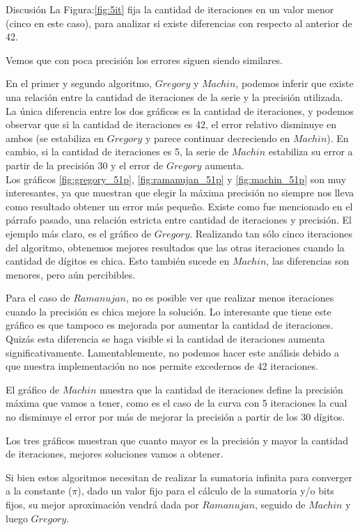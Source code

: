 \begin{section}{Discusión}
	La Figura:\ref{fig:5it} fija la cantidad de iteraciones en un valor menor (cinco en este caso), para analizar si existe diferencias con respecto al anterior de 42.
	
	Vemos que con poca precisión los errores siguen siendo similares.
	
	En el primer y segundo algoritmo, $Gregory$ y $Machin$, podemos inferir que existe una relación entre la cantidad de iteraciones de la serie y la precisión utilizada. La única diferencia entre los dos gráficos es la cantidad de iteraciones, y podemos observar que si la cantidad de iteraciones es 42, el error relativo disminuye en ambos (se estabiliza en $Gregory$ y parece continuar decreciendo en $Machin$). En cambio, si la cantidad de iteraciones es 5, la serie de $Machin$ estabiliza su error a partir de la precisión 30 y el error de $Gregory$ aumenta. \\
	
	Los gráficos \ref{fig:gregory_51p}, \ref{fig:ramanujan_51p} y \ref{fig:machin_51p} son muy interesantes, ya que muestran que elegir la máxima precisión no siempre nos lleva como resultado obtener un error más pequeño. Existe como fue mencionado en el párrafo pasado, una relación estricta entre cantidad de iteraciones y precisión. El ejemplo más claro, es el gráfico de $Gregory$. Realizando tan sólo cinco iteraciones del algoritmo, obtenemos mejores resultados que las otras iteraciones cuando la cantidad de dígitos es chica. Esto también sucede en $Machin$, las diferencias son menores, pero aún percibibles.
	
	Para el caso de $Ramanujan$, no es posible ver que realizar menos iteraciones cuando la precisión es chica mejore la solución. Lo interesante que tiene este gráfico es que tampoco es mejorada por aumentar la cantidad de iteraciones. Quizás esta diferencia se haga visible si la cantidad de iteraciones aumenta significativamente. Lamentablemente, no podemos hacer este análisis debido a que nuestra implementación no nos permite excedernos de 42 iteraciones.
	
	El gráfico de $Machin$ muestra que la cantidad de iteraciones define la precisión máxima que vamos a tener, como es el caso de la curva con 5 iteraciones la cual no disminuye el error por más de mejorar la precisión a partir de los 30 dígitos. 
	
	Los tres gráficos muestran que cuanto mayor es la precisión y mayor la cantidad de iteraciones, mejores soluciones vamos a obtener.
	
	Si bien estos algoritmos necesitan de realizar la sumatoria infinita para converger a la constante ($\pi$), dado un valor fijo para el cálculo de la sumatoria y/o bits fijos, su mejor aproximación vendrá dada por $Ramanujan$, seguido de $Machin$ y luego $Gregory$.
	\\
	

\end{section}
